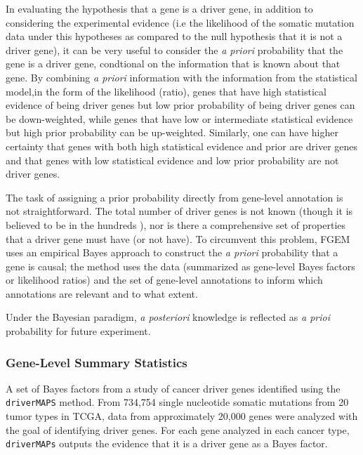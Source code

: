 In evaluating the hypothesis that a gene is a driver gene, in addition to considering the experimental evidence (i.e the likelihood of the somatic mutation data under this hypotheses as compared to the null hypothesis that it is not a driver gene), it can be very useful to consider the \emph{a priori} probability that the gene is a driver gene, condtional on the information that is known about that gene.  By combining \emph{a priori} information with the information from the statistical model,in the form of the likelihood (ratio), genes that have high statistical evidence of being driver genes but low prior probability of being driver genes can be down-weighted, while genes that have low or intermediate statistical evidence but high prior probability can be up-weighted.  Similarly, one can have higher certainty that genes with  both high statistical evidence and prior are driver genes and that genes with low statistical evidence and low prior probability are not driver genes.

The task of assigning a prior probability directly from gene-level annotation is not straightforward.  The total number of driver genes is not known (though it is believed to be in the hundreds \cite{Bailey_2018}), nor is there a comprehensive set of properties that a driver gene must have (or not have).  To circumvent this problem, FGEM uses an empirical Bayes approach to construct the \emph{a priori} probability that a gene is causal; the method uses the data (summarized as gene-level Bayes factors or likelihood ratios) and the set of gene-level annotations to inform which annotations are relevant and to what extent.

Under the Bayesian paradigm, \emph{a posteriori} knowledge is reflected as \emph{a prioi} probability for future experiment.  



\subsubsection{Gene-Level Summary Statistics}
\label{sec:orgb5696a3}

A set of Bayes factors from a study of cancer driver genes identified using the \texttt{driverMAPS} method\cite{drivermaps}.  From 734,754 single nucleotide somatic mutations from 20 tumor types in TCGA, data from approximately 20,000 genes were analyzed with the goal of identifying driver genes. For each gene analyzed in each cancer type, \texttt{driverMAPs} outputs the evidence that it is a driver gene as a Bayes factor.  

